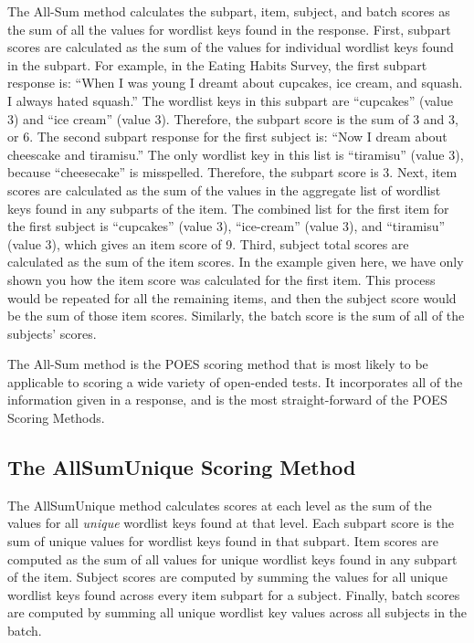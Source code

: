 \documentclass[11pt]{article}
\numberwithin{figure}{section}
\numberwithin{table}{section}
\begin{document}
The All-Sum method calculates the subpart, item, subject, and batch scores as the sum of all the values for wordlist keys found in the response.  First, subpart scores are calculated as the sum of the values for individual wordlist keys found in the subpart.  For example, in the Eating Habits Survey, the first subpart response is: ``When I was young I dreamt about cupcakes, ice cream, and squash.  I always hated squash.''  The wordlist keys in this subpart are ``cupcakes'' (value 3) and ``ice cream'' (value 3).  Therefore, the subpart score is the sum of 3 and 3, or 6.  The second subpart response for the first subject is: ``Now I dream about cheescake and tiramisu.''  The only wordlist key in this list is ``tiramisu'' (value 3), because ``cheesecake'' is misspelled.  Therefore, the subpart score is 3.
Next, item scores are calculated as the sum of the values in the aggregate list of wordlist keys found in any subparts of the item.  The combined list for the first item for the first subject is ``cupcakes'' (value 3), ``ice-cream'' (value 3), and ``tiramisu'' (value 3), which gives an item score of 9.
Third, subject total scores are calculated as the sum of the item scores.  In the example given here, we have only shown you how the item score was calculated for the first item.  This process would be repeated for all the remaining items, and then the subject score would be the sum of those item scores.  Similarly, the batch score is the sum of all of the subjects' scores.

The All-Sum method is the POES scoring method that is most likely to be applicable to scoring a wide variety of open-ended tests.  It incorporates all of the information given in a response, and is the most straight-forward of the POES Scoring Methods.

\subsection{The AllSumUnique Scoring Method}

The AllSumUnique method calculates scores at each level as the sum of the values for all \emph{unique} wordlist keys found at that level.  Each subpart score is the sum of unique values for wordlist keys found in that subpart.  Item scores are computed as the sum of all values for unique wordlist keys found in any subpart of the item.  Subject scores are computed by summing the values for all unique wordlist keys found across every item subpart for a subject.  Finally, batch scores are computed by summing all unique wordlist key values across all subjects in the batch.
\end{document}
